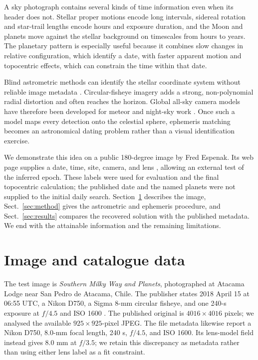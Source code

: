 \documentclass{aa}
\begin{document}
A sky photograph contains several kinds of time information even when its
header does not. Stellar proper motions encode long intervals, sidereal
rotation and star-trail lengths encode hours and exposure duration, and the
Moon and planets move against the stellar background on timescales from hours
to years. The planetary pattern is especially useful because it combines slow
changes in relative configuration, which identify a date, with faster apparent
motion and topocentric effects, which can constrain the time within that date.

Blind astrometric methods can identify the stellar coordinate system without
reliable image metadata \citep{Lang2010}. Circular-fisheye imagery adds a
strong, non-polynomial radial distortion and often reaches the horizon. Global
all-sky camera models have therefore been developed for meteor and night-sky
work \citep{borovicka1995,Barghini2019,Jeanne2019}. Once such a model maps every
detection onto the celestial sphere, ephemeris matching becomes an astronomical
dating problem rather than a visual identification exercise.

We demonstrate this idea on a public 180-degree image by Fred Espenak. Its web
page supplies a date, time, site, camera, and lens \citep{Espenak2018}, allowing
an external test of the inferred epoch. These labels were used for evaluation
and the final topocentric calculation; the published date and the named planets
were not supplied to the initial daily search. Section~\ref{sec:data} describes
the image, Sect.~\ref{sec:method} gives the astrometric and ephemeris procedure,
and Sect.~\ref{sec:results} compares the recovered solution with the published
metadata. We end with the attainable information and the remaining limitations.

\section{Image and catalogue data}
\label{sec:data}

The test image is \emph{Southern Milky Way and Planets}, photographed at
Atacama Lodge near San Pedro de Atacama, Chile. The publisher states 2018 April
15 at 06:55 UTC, a Nikon D750, a Sigma 8-mm circular fisheye, and one 240-s
exposure at $f/4.5$ and ISO 1600 \citep{Espenak2018}. The published original is
$4016\times4016$ pixels; we analysed the available $925\times925$-pixel JPEG.
The file metadata likewise report a Nikon D750, 8.0-mm focal length, 240 s,
$f/4.5$, and ISO 1600. Its lens-model field instead gives 8.0 mm at $f/3.5$;
we retain this discrepancy as metadata rather than using either lens label as a
fit constraint.
\end{document}
